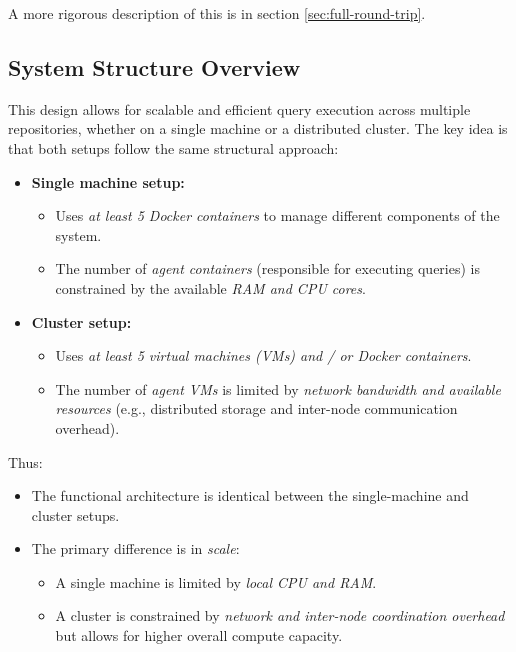 \documentclass[11pt]{article}
\begin{document}
A more rigorous description of this is in section \ref{sec:full-round-trip}.

\subsection{System Structure Overview}

This design allows for scalable and efficient query execution across multiple
repositories, whether on a single machine or a distributed cluster. The key idea
is that both setups follow the same structural approach:

\begin{itemize}
\item \textbf{Single machine setup:}
  \begin{itemize}
  \item Uses \textit{at least 5 Docker containers} to manage different
    components of the system.
  \item The number of \textit{agent containers} (responsible for executing
    queries) is constrained by the available \textit{RAM and CPU cores}.
  \end{itemize}
  
\item \textbf{Cluster setup:}
  \begin{itemize}
  \item Uses \textit{at least 5 virtual machines (VMs) and / or Docker containers}.
  \item The number of \textit{agent VMs} is limited by \textit{network bandwidth
      and available resources} (e.g., distributed storage and inter-node communication
    overhead).
  \end{itemize}
\end{itemize}

Thus:
\begin{itemize}
\item The {functional architecture is identical} between the single-machine and cluster setups.
\item The {primary difference} is in \textit{scale}:
  \begin{itemize}
  \item A single machine is limited by \textit{local CPU and RAM}.
  \item A cluster is constrained by \textit{network and inter-node coordination overhead} but allows for higher overall compute capacity.
  \end{itemize}
\end{itemize}
\end{document}
